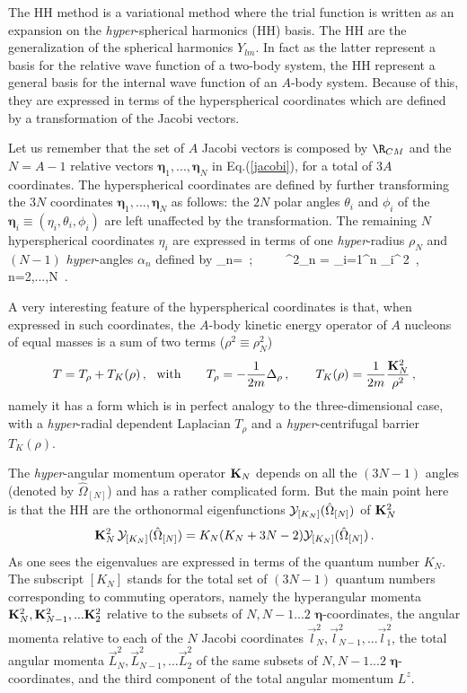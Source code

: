The HH method is a variational method where the trial function is written as
an expansion on the {\it hyper}-spherical harmonics (HH) basis. 
The HH are the generalization of the
spherical harmonics $Y_{lm}$. In fact as the latter represent a basis for the relative wave function of a two-body system,
the HH represent a general basis for the internal wave function of an $A$-body system.
Because of this,  they   are expressed in terms of the hyperspherical coordinates which are defined by a transformation 
of the Jacobi vectors.

Let us remember that the set of $A$ Jacobi vectors is composed 
by  $\R_{CM}$ and the $N=A-1$ relative vectors $\bm{\eta}_1,...,\bm{\eta}_N$ in Eq.(\ref{jacobi}), for a total of $3 A$ coordinates. 
The hyperspherical coordinates are defined by further transforming  
the $3N$ coordinates $\bm{\eta}_1,...,\bm{\eta}_N$ as follows:
the $2N$ polar angles $\theta_i$ and $\phi_i$ of the $\bm{\eta}_i\equiv(\eta_i,\theta_i,\phi_i)$ are left unaffected 
by the transformation. The remaining 
$N$  hyperspherical coordinates $\eta_i$ are expressed in terms of one {\it hyper}-radius $\rho_N$ and $(N-1)$ 
{\it hyper}-angles $\alpha_n$ defined by
\be
\sin\alpha_n= {} \,; \,\,\,\,\,\,\,\,\,\,\,\,\,\,\rho^2_n  = \sum_{i=1}^n \eta_i^{\,2}
 \,, \,\,\, n=2,...,N \,.
\ee

A very interesting feature of the hyperspherical coordinates is that, when expressed in such coordinates,
the $A$-body kinetic energy operator of $A$ nucleons of equal masses is a sum of two terms ($\rho^2 \equiv \rho^2_N$)
~\cite{HiD56}
 \begin{equation}\label{Trho}
  T =  T_\rho + T_K(\rho)\,,\,\,\,\, {\rm with} \qquad T_\rho= - \frac{1}{2m}\Delta_{\rho} \,, \qquad 
T_K(\rho)=\frac{1}{2 m} \frac{{\bf K}_N^2}{\rho^2}\,,
\end{equation} 
namely it has a form which is  in perfect analogy to the three-dimensional case, 
with a {\it hyper}-radial dependent Laplacian $T_\rho$ and a {\it hyper}-centrifugal barrier $T_K(\rho)$.

The {\it hyper}-angular momentum operator ${\bf K}_N$ depends on all the $(3N-1)$ angles (denoted by 
$\hat\Omega_{[N]}$) and has a rather complicated form. But the main point here is that the HH 
are the orthonormal eigenfunctions ${\cal Y}_{[K_N]}(\hat\Omega_{[N]})$ of ${\bf K}_N^2$
\begin{equation}
{\bf K}_N^2\,{\cal Y}_{[K_N]}(\hat\Omega_{[N]})= K_N(K_N+3N-2){\cal Y}_{[K_N]}(\hat\Omega_{[N]})\,.
\label{eigeneqK2}
\end{equation} 
As one sees the eigenvalues are expressed in terms of the quantum number $K_N$. 
The subscript $[K_N]$ stands for the total set of $(3N-1)$ quantum numbers corresponding to commuting operators, namely
the hyperangular momenta ${\bf K}^2_N, {\bf K}^2_{N-1},... {\bf K}^2_2$ relative to the subsets of $N,N-1...2$ $\bm \eta$-coordinates, 
the angular momenta relative to each of the $N$ Jacobi coordinates $\vec l^2_N,\vec l^2_{N-1},...\vec l^2_1 $,
the total angular momenta $\vec L^2_N,\vec L^2_{N-1},...\vec L^2_2$ of the same subsets of $N,N-1...2$ $\bm \eta$-coordinates, 
and the third component of the total angular momentum $L^z$.
 
